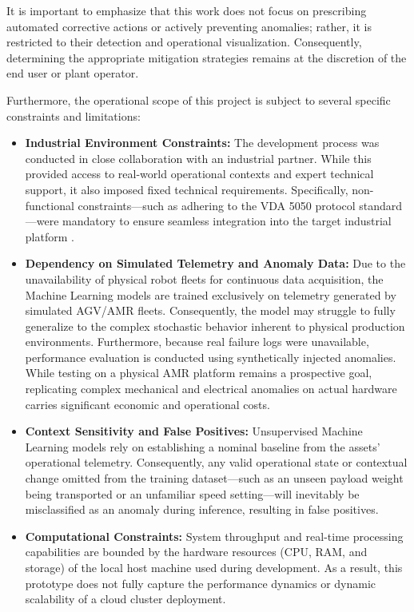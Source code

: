 It is important to emphasize that this work does not focus on prescribing automated corrective actions or actively preventing anomalies; rather, it is restricted to their detection and operational visualization. Consequently, determining the appropriate mitigation strategies remains at the discretion of the end user or plant operator.

Furthermore, the operational scope of this project is subject to several specific constraints and limitations:

\begin{itemize}
    \item \textbf{Industrial Environment Constraints:} The development process was conducted in close collaboration with an industrial partner. While this provided access to real-world operational contexts and expert technical support, it also imposed fixed technical requirements. Specifically, non-functional constraints—such as adhering to the VDA 5050 protocol standard \cite{vda5050standard}—were mandatory to ensure seamless integration into the target industrial platform \cite{edagMetys}.
    
    \item \textbf{Dependency on Simulated Telemetry and Anomaly Data:} Due to the unavailability of physical robot fleets for continuous data acquisition, the Machine Learning models are trained exclusively on telemetry generated by simulated AGV/AMR fleets. Consequently, the model may struggle to fully generalize to the complex stochastic behavior inherent to physical production environments. Furthermore, because real failure logs were unavailable, performance evaluation is conducted using synthetically injected anomalies. While testing on a physical AMR platform remains a prospective goal, replicating complex mechanical and electrical anomalies on actual hardware carries significant economic and operational costs.
    
    \item \textbf{Context Sensitivity and False Positives:} Unsupervised Machine Learning models rely on establishing a nominal baseline from the assets' operational telemetry. Consequently, any valid operational state or contextual change omitted from the training dataset—such as an unseen payload weight being transported or an unfamiliar speed setting—will inevitably be misclassified as an anomaly during inference, resulting in false positives.
    
    \item \textbf{Computational Constraints:} System throughput and real-time processing capabilities are bounded by the hardware resources (CPU, RAM, and storage) of the local host machine used during development. As a result, this prototype does not fully capture the performance dynamics or dynamic scalability of a cloud cluster deployment.
    

\end{itemize}
